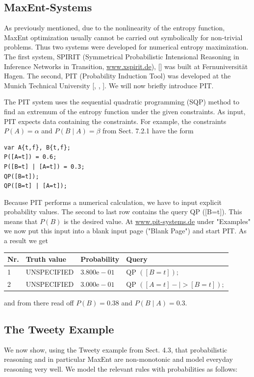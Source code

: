 \documentclass[10pt]{book}
\begin{document}
\subsection{MaxEnt-Systems}
As previously mentioned, due to the nonlinearity of the entropy function, MaxEnt optimization usually cannot be carried out symbolically for non-trivial problems. Thus two systems were developed for numerical entropy maximization. The first system, SPIRIT (Symmetrical Probabilistic Intensional Reasoning in Inference Networks in Transition, \href{http://www.xspirit.de}{www.xspirit.de}), [\cite{rm96}] was built at Fernuniversität Hagen. The second, PIT (Probability Induction Tool) was developed at the Munich Technical University [\cite{sch96}, \cite{es99}, \cite{se00}]. We will now briefly introduce PIT.

The PIT system uses the sequential quadratic programming (SQP) method to find an extremum of the entropy function under the given constraints. As input, PIT expects data containing the constraints. For example, the constraints $P(A)=\alpha$ and $P(B \mid A)=\beta$ from Sect. 7.2.1 have the form
\begin{verbatim}
var A{t,f}, B{t,f};
P([A=t]) = 0.6;
P([B=t] | [A=t]) = 0.3;
QP([B=t]);
QP([B=t] | [A=t]);
\end{verbatim}

Because PIT performs a numerical calculation, we have to input explicit probability values. The second to last row contains the query QP ([B=t]). This means that $P(B)$ is the desired value. At \href{http://www.pit-systems.de}{www.pit-systems.de} under "Examples" we now put this input into a blank input page ("Blank Page") and start PIT. As a result we get

\begin{center}
\begin{tabular}{llll}
\hline
Nr. & Truth value & Probability & Query \\
\hline
1 & UNSPECIFIED & $3.800 \mathrm{e}-01$ & QP $([B=t]) ;$ \\
\hline
2 & UNSPECIFIED & $3.000 \mathrm{e}-01$ & QP $([A=t]-\mid>[B=t]) ;$ \\
\hline
\end{tabular}
\end{center}

and from there read off $P(B)=0.38$ and $P(B \mid A)=0.3$.

\subsection{The Tweety Example}
We now show, using the Tweety example from Sect. 4.3, that probabilistic reasoning and in particular MaxEnt are non-monotonic and model everyday reasoning very well. We model the relevant rules with probabilities as follows:
\end{document}
